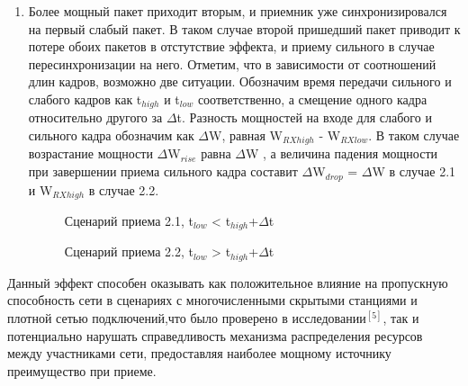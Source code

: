 \documentclass{llncs}
\begin{document}
\begin{enumerate}
\item Более мощный пакет приходит вторым, и приемник уже синхронизировался на первый слабый пакет. В таком случае второй пришедший пакет приводит к потере обоих пакетов в отстутствие эффекта, и приему сильного в случае пересинхронизации на него. Отметим, что в зависимости от соотношений  длин кадров, возможно две ситуации. Обозначим время передачи сильного и слабого кадров как t$_{high}$ и t$_{low}$ соответственно, а смещение одного кадра относительно другого за $\Delta$t. Разность мощностей на входе для слабого и сильного кадра обозначим как $\Delta$W, равная W$_{RX high}$ - W$_{RX low}$. В таком случае возрастание мощности $\Delta$W$_{rise}$  равна $\Delta$W , а величина падения мощности при завершении приема сильного кадра составит $\Delta$W$_{drop}$ = $\Delta$W в случае 2.1 и W$_{RX high}$ в случае 2.2.
\\
\begin{figure}[]
\caption{Сценарий приема 2.1, t$_{low}$ < t$_{high}$+$\Delta$t}
\label{ris:image}
\end{figure}
\begin{figure}[]
\caption{Сценарий приема 2.2, t$_{low}$ > t$_{high}$+$\Delta$t}
\label{ris:image}
\end{figure}

\end{enumerate}
Данный эффект способен оказывать как положительное влияние на пропускную способность сети в сценариях с многочисленными скрытыми станциями и плотной сетью подключений,что было проверено в исследовании$^{[5]}$, так и потенциально нарушать справедливость механизма распределения ресурсов между участниками сети, предоставляя наиболее мощному источнику преимущество при приеме.  
\end{document}
